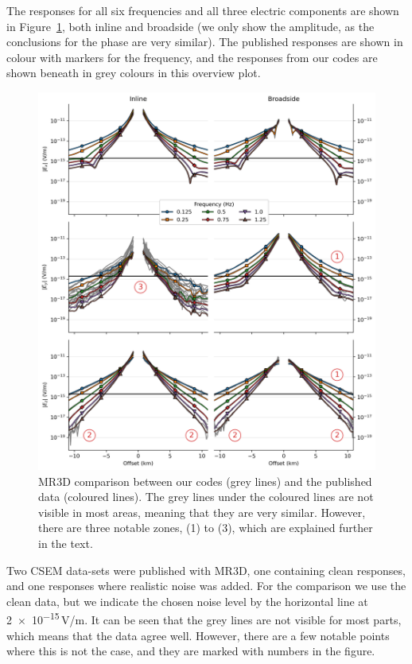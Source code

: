\documentclass[extra, camera,%
]{gji}
\newlength{\fwidth}
\begin{document}
The responses for all six frequencies and all three electric components are shown in Figure~\ref{fig:results-marlim-responses}, both inline and broadside (we only show the amplitude, as the conclusions for the phase are very similar). The published responses are shown in colour with markers for the frequency, and the responses from our codes are shown beneath in grey colours in this overview plot.
%
\begin{figure}
  \centering
  \includegraphics[width=.9\fwidth]{figures/results-marlim-responses.png}
  \caption{MR3D comparison between our codes (grey lines) and the published data (coloured lines). The grey lines under the coloured lines are not visible in most areas, meaning that they are very similar. However, there are three notable zones, (1) to (3), which are explained further in the text.}
  \label{fig:results-marlim-responses}
\end{figure}
%
Two CSEM data-sets were published with MR3D, one containing clean responses, and one responses where realistic noise was added. For the comparison we use the clean data, but we indicate the chosen noise level by the horizontal line at \num{2e-15}\,V/m. It can be seen that the grey lines are not visible for most parts, which means that the data agree well. However, there are a few notable points where this is not the case, and they are marked with numbers in the figure.
\end{document}
